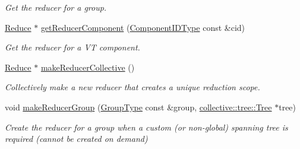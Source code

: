 \begin{DoxyCompactItemize}
\begin{DoxyCompactList}\small\item\em Get the reducer for a group. \end{DoxyCompactList}\item 
\hyperlink{structvt_1_1collective_1_1reduce_1_1_reduce}{Reduce} $\ast$ \hyperlink{structvt_1_1collective_1_1reduce_1_1_reduce_manager_ae154a987a32dfa8c86e0391a2915579d}{get\+Reducer\+Component} (\hyperlink{namespacevt_ab6ac935c168b809c422d5121da4f2700}{Component\+I\+D\+Type} const \&cid)
\begin{DoxyCompactList}\small\item\em Get the reducer for a VT component. \end{DoxyCompactList}\item 
\hyperlink{structvt_1_1collective_1_1reduce_1_1_reduce}{Reduce} $\ast$ \hyperlink{structvt_1_1collective_1_1reduce_1_1_reduce_manager_a4b81ceab5d9f081f393dd68cece25935}{make\+Reducer\+Collective} ()
\begin{DoxyCompactList}\small\item\em Collectively make a new reducer that creates a unique reduction scope. \end{DoxyCompactList}\item 
void \hyperlink{structvt_1_1collective_1_1reduce_1_1_reduce_manager_a44fa84680d3b310f4cb3f6c776a31751}{make\+Reducer\+Group} (\hyperlink{namespacevt_a27b5e4411c9b6140c49100e050e2f743}{Group\+Type} const \&group, \hyperlink{structvt_1_1collective_1_1tree_1_1_tree}{collective\+::tree\+::\+Tree} $\ast$tree)
\begin{DoxyCompactList}\small\item\em Create the reducer for a group when a custom (or non-\/global) spanning tree is required (cannot be created on demand) \end{DoxyCompactList}\end{DoxyCompactItemize}

